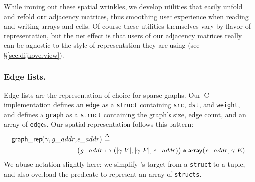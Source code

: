 While ironing out these spatial wrinkles, we develop utilities that easily 
unfold and refold our adjacency matrices, thus smoothing user 
experience when reading and writing arrays and cells. Of course
these utilities themselves vary by flavor of representation, but 
the net effect is that users of our adjacency matrices really can 
be agnostic to the style of representation they are using 
(see \S\ref{sec:dijkoverview}).



\subsubsection{Edge lists.}

Edge lists are the representation of choice 
for sparse graphs. Our~C implementation 
defines an \texttt{edge} as a 
\texttt{struct} containing \texttt{src}, \texttt{dst}, and 
\texttt{weight}, and defines a \texttt{graph} as a 
\texttt{struct} containing 
the graph's size, edge count, 
and an array of \texttt{edge}s. Our spatial representation 
follows this pattern:
\vspace{-0.5em}
\begin{equation*}
\begin{split}
\mathsf{graph\_rep}(\gamma, \mathit{g\_addr}, &\mathit{e\_addr})~\mathbin{\stackrel{\Delta}{=}}~ \\
&\big(\mathit{g\_addr} \mapsto (\lvert\gamma.V\rvert, \lvert\gamma.E\rvert, \mathit{e\_addr})\big)
\ast
\mathsf{array}(\mathit{e\_addr},\gamma.E)
\end{split}
\end{equation*}
We abuse notation slightly here: we simplify 's target 
from a \texttt{struct} to a tuple, and also overload the  predicate to represent 
an array of \texttt{structs}.



